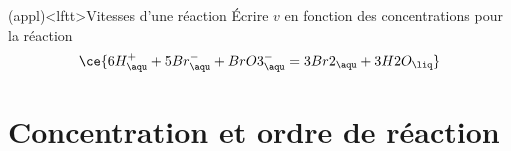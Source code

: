 \documentclass[../../main/main.tex]{subfiles}
\begin{document}

\begin{tcb}[breakable](appl)<lftt>{Vitesses d'une réaction}
	Écrire $v$ en fonction des concentrations pour la réaction
	\[
		\ce{6H^{+}_{\aqu} + 5Br^{-}_{\aqu} + BrO3^{-}_{\aqu}
			=
			3Br2_{\aqu} + 3H2O_{\liq}}
	\]
	\tcblower
	\vspace{-15pt}
\end{tcb}

\section{Concentration et ordre de réaction}
\end{document}
